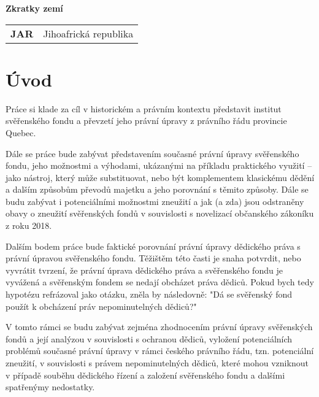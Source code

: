 \documentclass{article}
\begin{document}
\vspace{5 mm}

\textbf{Zkratky zemí}

\vspace{5 mm}

\begin{tabular}{p{3cm}p{8cm}}
\textbf{JAR} & Jihoafrická republika	 \\
\end{tabular}

\newpage
  
\section{Úvod}

Práce si klade za cíl v historickém a právním kontextu představit institut svěřenského fondu a převzetí jeho právní úpravy z právního řádu provincie Quebec.
\linebreak

\indent Dále se práce bude zabývat představením současné právní úpravy svěřens\-kého fondu, jeho možnostmi a výhodami, ukázanými na příkladu praktického využití – jako nástroj, který může substituovat, nebo být komplementem klasickému dědění a dalším způsobům převodů majetku a jeho porovnání s těmito způsoby. Dále se budu zabývat i potenciálními možnostmi zneužití a jak (a zda) jsou odstraněny obavy o zneužití svěřenských fondů v souvislosti s novelizací občanského zákoníku z roku 2018.
\linebreak

\indent Dalším bodem práce bude faktické porovnání právní úpravy dědického práva s právní úpravou svěřenského fondu. Těžištěm této časti je snaha potvrdit, nebo vyvrátit tvrzení, že právní úprava dědického práva a svěřenského fondu je vyvážená a svěřenským fondem se nedají obcházet práva dědiců. Pokud bych tedy hypotézu refrázoval jako otázku, zněla by následovně: "Dá se svěřenský fond použít k obcházení práv nepominutelných dědiců?"
\linebreak

\indent V tomto rámci se budu zabývat zejména zhodnocením právní úpravy svěřens\-kých fondů a její analýzou v souvislosti s ochranou dědiců, vyložení potenciálních problémů současné právní úpravy v rámci českého právního řádu, tzn. potenciální zneužití, v souvislosti s právem nepominutelných dědiců, které mohou vzniknout v případě souběhu dědického řízení a založení svěřenského fondu a dalšími spatřenýmy nedostatky.
\linebreak
\end{document}
